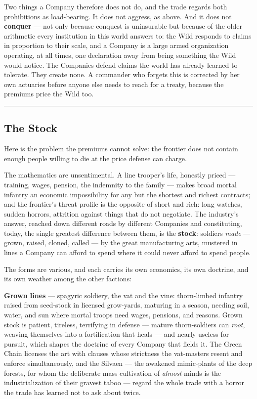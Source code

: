 Two things a Company therefore does not do, and the trade regards both prohibitions as load-bearing. It does not aggress, as above. And it does not \textbf{conquer} --- not only because conquest is uninsurable but because of the older arithmetic every institution in this world answers to: the Wild responds to claims in proportion to their scale, and a Company is a large armed organization operating, at all times, one declaration away from being something the Wild would notice. The Companies defend claims the world has already learned to tolerate. They create none. A commander who forgets this is corrected by her own actuaries before anyone else needs to reach for a treaty, because the premiums price the Wild too.

\medskip\hrule\medskip

\subsection{The Stock}

Here is the problem the premiums cannot solve: the frontier does not contain enough people willing to die at the price defense can charge.

The mathematics are unsentimental. A line trooper's life, honestly priced --- training, wages, pension, the indemnity to the family --- makes broad mortal infantry an economic impossibility for any but the shortest and richest contracts; and the frontier's threat profile is the opposite of short and rich: long watches, sudden horrors, attrition against things that do not negotiate. The industry's answer, reached down different roads by different Companies and constituting, today, the single greatest difference between them, is the \textbf{stock}: soldiers \textit{made} --- grown, raised, cloned, called --- by the great manufacturing arts, mustered in lines a Company can afford to spend where it could never afford to spend people.

The forms are various, and each carries its own economics, its own doctrine, and its own weather among the other factions:

\textbf{Grown lines} --- spagyric soldiery, the vat and the vine: thorn-limbed infantry raised from seed-stock in licensed grow-yards, maturing in a season, needing soil, water, and sun where mortal troops need wages, pensions, and reasons. Grown stock is patient, tireless, terrifying in defense --- mature thorn-soldiers can \textit{root}, weaving themselves into a fortification that heals --- and nearly useless for pursuit, which shapes the doctrine of every Company that fields it. The Green Chain licenses the art with clauses whose strictness the vat-masters resent and enforce simultaneously, and the Silvaen --- the awakened mimic-plants of the deep forests, for whom the deliberate mass cultivation of \textit{almost}-minds is the industrialization of their gravest taboo --- regard the whole trade with a horror the trade has learned not to ask about twice.

